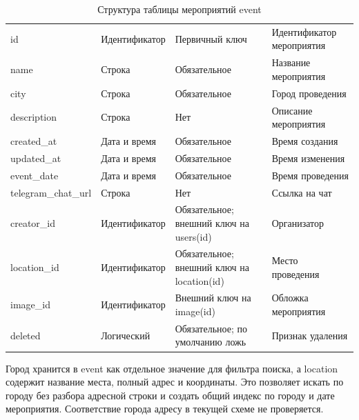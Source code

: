 \begin{table}[H]
    \caption{Структура таблицы мероприятий event}
    \label{tab:design-event}
    \small
    \begin{tabularx}{\textwidth}{|L{3.5cm}|L{2.9cm}|Y|Y|}
        \hline
         &  &  &  \\
        \hline
        id & Идентификатор & Первичный ключ & Идентификатор мероприятия \\
        \hline
        name & Строка & Обязательное & Название мероприятия \\
        \hline
        city & Строка & Обязательное & Город проведения \\
        \hline
        description & Строка & Нет & Описание мероприятия \\
        \hline
        created\_at & Дата и время & Обязательное & Время создания \\
        \hline
        updated\_at & Дата и время & Обязательное & Время изменения \\
        \hline
        event\_date & Дата и время & Обязательное & Время проведения \\
        \hline
        telegram\_chat\_url & Строка & Нет & Ссылка на чат \\
        \hline
        creator\_id & Идентификатор & Обязательное; внешний ключ на users(id) & Организатор \\
        \hline
        location\_id & Идентификатор & Обязательное; внешний ключ на location(id) & Место проведения \\
        \hline
        image\_id & Идентификатор & Внешний ключ на image(id) & Обложка мероприятия \\
        \hline
        deleted & Логический & Обязательное; по умолчанию ложь & Признак удаления \\
        \hline
    \end{tabularx}
\end{table}

Город хранится в event как отдельное значение для фильтра поиска, а location содержит название места, полный адрес и координаты. Это позволяет искать по городу без разбора адресной строки и создать общий индекс по городу и дате мероприятия. Соответствие города адресу в текущей схеме не проверяется.

